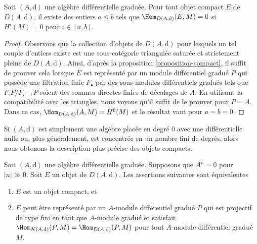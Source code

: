 \begin{lemma}
\label{lemma-compact-implies-bounded}
Soit $(A, \text{d})$ une algèbre différentielle
graduée. Pour tout objet compact $E$ de $D(A, \text{d})$, il
existe des entiers $a \leq b$ tels que $\Hom_{D(A, \text{d})}(E, M) = 0$
si $H^i(M) = 0$ pour $i \in [a, b]$.
\end{lemma}

\begin{proof}
Observons que la collection d'objets de $D(A, \text{d})$ pour lesquels un
tel couple d'entiers existe est une sous-catégorie triangulée saturée et strictement
pleine de $D(A, \text{d})$. Ainsi,
d'après la proposition \ref{proposition-compact}, il suffit de prouver cela
lorsque $E$ est représenté par un module différentiel gradué $P$ qui possède
une filtration finie $F_\bullet$ par des sous-modules différentiels gradués tels
que $F_iP/F_{i - 1}P$ soient des sommes directes finies de décalages de $A$.
En utilisant la compatibilité avec les triangles, nous voyons qu'il
suffit de le prouver pour $P = A$. Dans ce cas, $\Hom_{D(A, \text{d})}(A, M) = H^0(M)$ et
le résultat vaut pour $a = b = 0$.
\end{proof}

\noindent
Si $(A, \text{d})$ est simplement une algèbre placée en degré $0$
avec une différentielle nulle ou, plus généralement,
est concentrée en un nombre fini de degrés, alors nous obtenons
la description plus précise des objets compacts.

\begin{lemma}
\label{lemma-compact}
Soit $(A, \text{d})$ une algèbre différentielle graduée. Supposons que $A^n = 0$
pour $|n| \gg 0$. Soit $E$ un objet de $D(A, \text{d})$. Les
assertions suivantes sont équivalentes
\begin{enumerate}
\item $E$ est un objet compact, et
\item $E$ peut être représenté par un $A$-module différentiel gradué $P$
qui est projectif de type fini en tant que $A$-module gradué et
satisfait $\Hom_{K(A, \text{d})}(P, M) = \Hom_{D(A, \text{d})}(P,
M)$ pour tout $A$-module différentiel gradué $M$.
\end{enumerate}
\end{lemma}


